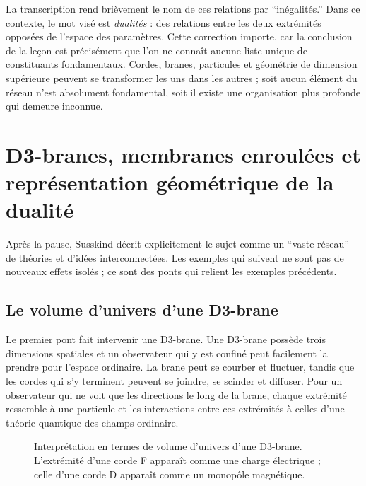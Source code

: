La transcription rend brièvement le nom de ces relations par ``inégalités.'' Dans ce contexte, le mot visé est \emph{dualités} : des relations entre les deux extrémités opposées de l’espace des paramètres. Cette correction importe, car la conclusion de la leçon est précisément que l’on ne connaît aucune liste unique de constituants fondamentaux. Cordes, branes, particules et géométrie de dimension supérieure peuvent se transformer les uns dans les autres ; soit aucun élément du réseau n’est absolument fondamental, soit il existe une organisation plus profonde qui demeure inconnue.

\section{D3-branes, membranes enroulées et représentation géométrique de la dualité}

Après la pause, Susskind décrit explicitement le sujet comme un ``vaste réseau'' de théories et d’idées interconnectées. Les exemples qui suivent ne sont pas de nouveaux effets isolés ; ce sont des ponts qui relient les exemples précédents.

\subsection{Le volume d’univers d’une D3-brane}

Le premier pont fait intervenir une D3-brane. Une D3-brane possède trois dimensions spatiales et un observateur qui y est confiné peut facilement la prendre pour l’espace ordinaire. La brane peut se courber et fluctuer, tandis que les cordes qui s’y terminent peuvent se joindre, se scinder et diffuser. Pour un observateur qui ne voit que les directions le long de la brane, chaque extrémité ressemble à une particule et les interactions entre ces extrémités à celles d’une théorie quantique des champs ordinaire.

\begin{figure}[htbp]
\centering
{}%
\caption{Interprétation en termes de volume d’univers d’une D3-brane. L’extrémité d’une corde F apparaît comme une charge électrique ; celle d’une corde D apparaît comme un monopôle magnétique.}
\end{figure}

